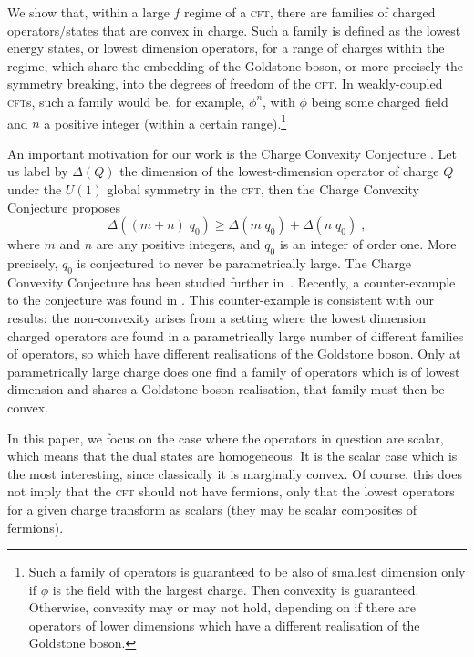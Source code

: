 \documentclass[11pt]{article}
\numberwithin{equation}{section}
\newcommand{\be}{\begin{equation}} \newcommand{\ee}{\end{equation}}
\begin{document}
	We show that, within a large $f$ regime of a \textsc{cft}, there are families of charged operators/states that are convex in charge. Such a family is defined as the lowest energy states, or lowest dimension operators, for a range of charges within the regime, which share the embedding of the Goldstone boson, or more precisely the symmetry breaking, into the degrees of freedom of the \textsc{cft}. In weakly-coupled \textsc{cft}s, such a family would be, for example, $\phi^n$, with $\phi$ being some charged field and $n$ a positive integer (within a certain range).\footnote{Such a family of operators is guaranteed to be also of smallest dimension only if $\phi$ is the field with the largest charge. Then convexity is guaranteed. Otherwise, convexity may or may not hold, depending on if there are operators of lower dimensions which have a different realisation of the Goldstone boson.}
	
	An important motivation for our work is the Charge Convexity Conjecture \cite{Aharony:2021mpc}. Let us label by $\Delta(Q)$ the dimension of the lowest-dimension operator of charge $Q$ under the $U(1)$ global symmetry in the \textsc{cft}, then the Charge Convexity Conjecture proposes~\cite{Aharony:2021mpc}
	\be
	\Delta\left( \left(m+n\right)\;q_0 \right) \geq \Delta\left( m\; q_0 \right) + \Delta\left( n\; q_0 \right) \;,
	\label{ccc}
	\ee
	where $m$ and $n$ are any positive integers, and $q_0$ is an integer of order one. More precisely, $q_0$ is conjectured to never be parametrically large. The Charge Convexity Conjecture has been studied further in~\cite{Dupuis:2021flq,Antipin:2021rsh,Moser:2021bes,Aalsma:2021qga,Watanabe:2022htq,Palti:2022unw}. Recently, a counter-example to the conjecture was found in \cite{Sharon:2023drx}. This counter-example is consistent with our results: the non-convexity arises from a setting where the lowest dimension charged operators are found in a parametrically large number of different families of operators, so which have different realisations of the Goldstone boson. Only at parametrically large charge does one find a family of operators which is of lowest dimension and shares a Goldstone boson realisation, that family must then be convex.
		
	 In this paper, we focus on the case where the operators in question are scalar, which means that the dual states are homogeneous. It is the scalar case which is the most interesting, since classically it is marginally convex. Of course, this does not imply that the \textsc{cft} should not have fermions, only that the lowest operators for a given charge transform as scalars (they may be scalar composites of fermions). 
	
\end{document}
